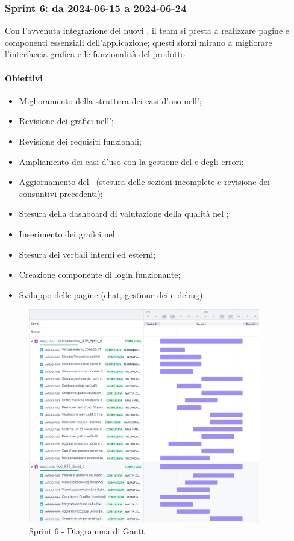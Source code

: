 \subsubsection{Sprint 6: da 2024-06-15 a 2024-06-24}
\par Con l'avvenuta integrazione dei nuovi , il team si presta a realizzare pagine e componenti essenziali dell'applicazione; questi sforzi mirano a migliorare l'interfaccia grafica e le funzionalità del prodotto.


\paragraph{Obiettivi}
\begin{itemize}
  \item Miglioramento della struttura dei casi d'uso nell'\AdR;
  \item Revisione dei grafici nell'\AdR;
  \item Revisione dei requisiti funzionali;
  \item Ampliamento dei casi d'uso con la gestione del  e degli errori;
  \item Aggiornamento del \PdP\ (stesura delle sezioni incomplete e revisione dei consuntivi precedenti);
  \item Stesura della dashboard di valutazione della qualità nel \PdQ;
  \item Inserimento dei grafici nel \PdQ;
  \item Stesura dei verbali interni ed esterni;
  \item Creazione componente di login funzionante;
  \item Sviluppo delle pagine  (chat, gestione dei  e debug).
\end{itemize}

\begin{figure}[H]
  \centering
  \includegraphics[width=0.90\textwidth]{assets/Pianificazione/Sprint-6/gantt.png}
  \caption{Sprint 6 - Diagramma di Gantt}\label{fig:sprint-6-gantt}
\end{figure}
